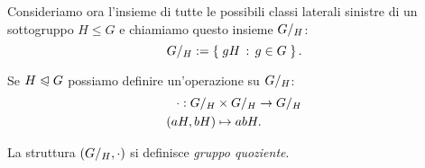 Consideriamo ora l'insieme di tutte le possibili classi laterali sinistre di un sottogruppo $H \leq G$ e chiamiamo questo insieme ${G}/_{H}$: \begin{equation}
    {G}/_{H} := \left\{\;gH \,:\, g \in G\;\right\}.
\end{equation}

Se $H \trianglelefteqslant G$ possiamo definire un'operazione su ${G}/_{H}$: \begin{align} \label{eq:op_gruppo_quoziente}
    \begin{split}
        \cdot : {G}/_{H} &\times {G}/_{H} \to {G}/_{H} \\
        (aH, bH) &\mapsto abH.
    \end{split}
\end{align}

La struttura $({G}/_{H}, \cdot)$ si definisce \emph{gruppo quoziente}.


